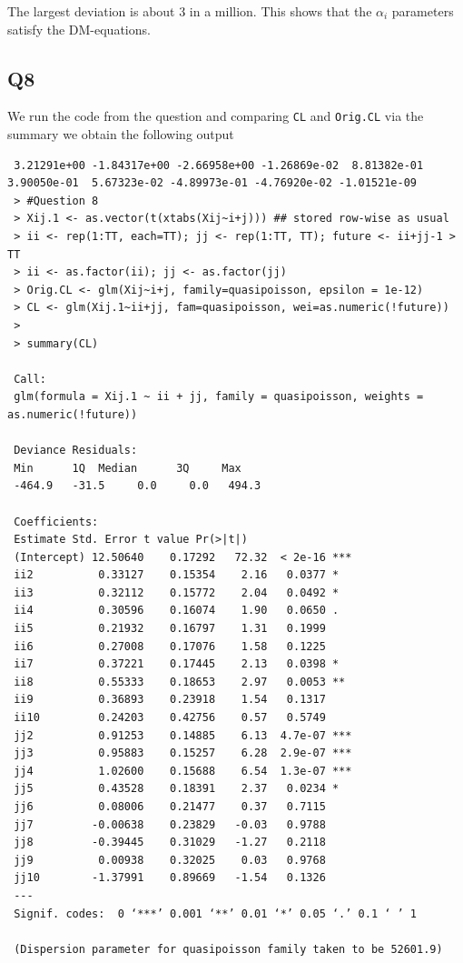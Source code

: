 \documentclass[11pt]{article}
\begin{document}
The largest deviation is about 3 in a million. This shows that the $\alpha_i$ parameters satisfy the DM-equations.

\subsection*{Q8}
We run the code from the question and comparing \verb|CL| and \verb|Orig.CL| via the summary we obtain the following output 

\begin{verbatim}
 3.21291e+00 -1.84317e+00 -2.66958e+00 -1.26869e-02  8.81382e-01  3.90050e-01  5.67323e-02 -4.89973e-01 -4.76920e-02 -1.01521e-09 
 > #Question 8
 > Xij.1 <- as.vector(t(xtabs(Xij~i+j))) ## stored row-wise as usual
 > ii <- rep(1:TT, each=TT); jj <- rep(1:TT, TT); future <- ii+jj-1 > TT
 > ii <- as.factor(ii); jj <- as.factor(jj)
 > Orig.CL <- glm(Xij~i+j, family=quasipoisson, epsilon = 1e-12)
 > CL <- glm(Xij.1~ii+jj, fam=quasipoisson, wei=as.numeric(!future))
 > 
 > summary(CL)
 
 Call:
 glm(formula = Xij.1 ~ ii + jj, family = quasipoisson, weights = as.numeric(!future))
 
 Deviance Residuals: 
 Min      1Q  Median      3Q     Max  
 -464.9   -31.5     0.0     0.0   494.3  
 
 Coefficients:
 Estimate Std. Error t value Pr(>|t|)    
 (Intercept) 12.50640    0.17292   72.32  < 2e-16 ***
 ii2          0.33127    0.15354    2.16   0.0377 *  
 ii3          0.32112    0.15772    2.04   0.0492 *  
 ii4          0.30596    0.16074    1.90   0.0650 .  
 ii5          0.21932    0.16797    1.31   0.1999    
 ii6          0.27008    0.17076    1.58   0.1225    
 ii7          0.37221    0.17445    2.13   0.0398 *  
 ii8          0.55333    0.18653    2.97   0.0053 ** 
 ii9          0.36893    0.23918    1.54   0.1317    
 ii10         0.24203    0.42756    0.57   0.5749    
 jj2          0.91253    0.14885    6.13  4.7e-07 ***
 jj3          0.95883    0.15257    6.28  2.9e-07 ***
 jj4          1.02600    0.15688    6.54  1.3e-07 ***
 jj5          0.43528    0.18391    2.37   0.0234 *  
 jj6          0.08006    0.21477    0.37   0.7115    
 jj7         -0.00638    0.23829   -0.03   0.9788    
 jj8         -0.39445    0.31029   -1.27   0.2118    
 jj9          0.00938    0.32025    0.03   0.9768    
 jj10        -1.37991    0.89669   -1.54   0.1326    
 ---
 Signif. codes:  0 ‘***’ 0.001 ‘**’ 0.01 ‘*’ 0.05 ‘.’ 0.1 ‘ ’ 1
 
 (Dispersion parameter for quasipoisson family taken to be 52601.9)
 

\end{verbatim}
\end{document}

